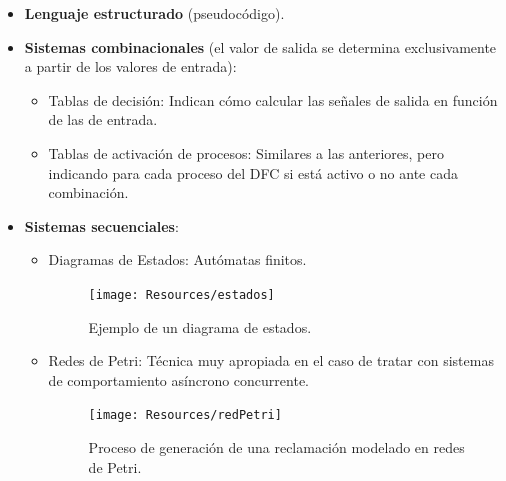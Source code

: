 \begin{itemize}
    \item \textbf{Lenguaje estructurado} (pseudocódigo).
    \item \textbf{Sistemas combinacionales} (el valor de salida se determina exclusivamente a partir de los valores de entrada):
    \begin{itemize}
        \item Tablas de decisión: Indican cómo calcular las señales de salida en función de las de entrada.
        \begin{table}[h!]
            \centering
            \caption{Ejemplo de tabla de decisiones de un proceso.}
        \end{table}
        \item Tablas de activación de procesos: Similares a las anteriores, pero indicando para cada proceso del DFC si está activo o no ante cada combinación.
    \end{itemize}
    \item \textbf{Sistemas secuenciales}:
    \begin{itemize}
        \item Diagramas de Estados: Autómatas finitos.
        \begin{figure}[h!]
            \centering
            \texttt{[image: Resources/estados]}
            \caption{Ejemplo de un diagrama de estados.}
        \end{figure}
        \item Redes de Petri: Técnica muy apropiada en el caso de tratar con sistemas de comportamiento asíncrono concurrente.
        \begin{figure}[H]
            \centering
            \texttt{[image: Resources/redPetri]}
            \caption{Proceso de generación de una reclamación modelado en redes de Petri.}
        \end{figure}
    \end{itemize}
\end{itemize}

